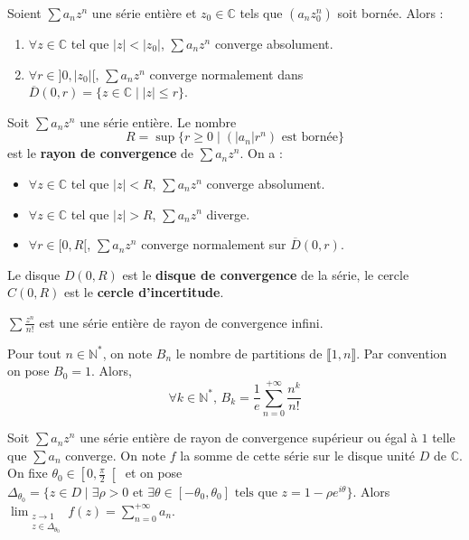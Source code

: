   \begin{lemma}
    Soient $\sum a_n z^n$ une série entière et $z_0 \in \mathbb{C}$ tels que $(a_n z_0^n)$ soit bornée. Alors :
    \begin{enumerate}[label={\bfseries(\roman*)}]
      \item $\forall z \in \mathbb{C}$ tel que $|z| < |z_0|$, $\sum a_n z^n$ converge absolument.
      \item $\forall r \in ]0,|z_0|[, \, \sum a_n z^n$ converge normalement dans $\overline{D}(0, r) = \{ z \in \mathbb{C} \mid |z| \leq r \}$.
    \end{enumerate}
  \end{lemma}

  \begin{definition}
    Soit $\sum a_n z^n$ une série entière. Le nombre
    \[ R = \sup \{ r \geq 0 \mid (|a_n|r^n) \text{ est bornée} \} \]
    est le \textbf{rayon de convergence} de $\sum a_n z^n$. On a :
    \begin{itemize}
      \item $\forall z \in \mathbb{C}$ tel que $|z| < R$, $\sum a_n z^n$ converge absolument.
      \item $\forall z \in \mathbb{C}$ tel que $|z| > R$, $\sum a_n z^n$ diverge.
      \item $\forall r \in [0,R[$, $\sum a_n z^n$ converge normalement sur $\overline{D}(0,r)$.
    \end{itemize}
    Le disque $D(0,R)$ est le \textbf{disque de convergence} de la série, le cercle $C(0,R)$ est le \textbf{cercle d'incertitude}.
  \end{definition}

  \begin{example}
    $\sum \frac{z^n}{n!}$ est une série entière de rayon de convergence infini.
  \end{example}


  \begin{theorem}
    Pour tout $n \in \mathbb{N}^*$, on note $B_n$ le nombre de partitions de $\llbracket 1, n \rrbracket$. Par convention on pose $B_0 = 1$. Alors,
    \[ \forall k \in \mathbb{N}^*, \, B_k = \frac{1}{e} \sum_{n=0}^{+\infty} \frac{n^k}{n!} \]
  \end{theorem}


  \begin{theorem}
    \label{230-1}
    Soit $\sum a_n z^n$ une série entière de rayon de convergence supérieur ou égal à $1$ telle que $\sum a_n$ converge. On note $f$ la somme de cette série sur le disque unité $D$ de $\mathbb{C}$. On fixe $\theta_0 \in \left[ 0, \frac{\pi}{2} \right[$ et on pose $\Delta_{\theta_0} = \{ z \in D \mid \exists \rho > 0 \text{ et } \exists \theta \in [-\theta_0, \theta_0] \text{ tels que } z = 1 - \rho e^{i\theta} \}$.
    \newpar
    Alors $\lim_{\substack{z \rightarrow 1 \\ z \in \Delta_{\theta_0}}} f(z) = \sum_{n=0}^{+\infty} a_n$.
  \end{theorem}

